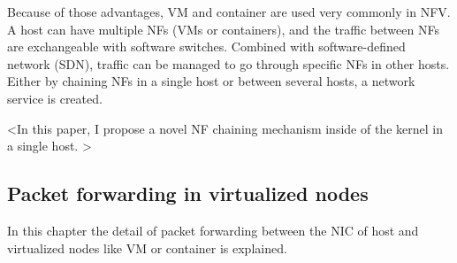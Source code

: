 Because of those advantages, VM and container are used very commonly in NFV. A host can have multiple NFs (VMs or containers), and the traffic between NFs are exchangeable with software switches. Combined with software-defined network (SDN), traffic can be managed to go through specific NFs in other hosts. Either by chaining NFs in a single host or between several hosts, a network service is created. 

<In this paper, I propose a novel NF chaining mechanism inside of the kernel in a single host. >

\subsection{Packet forwarding in virtualized nodes}
In this chapter the detail of packet forwarding between the NIC of host and virtualized nodes like VM or container is explained. 


